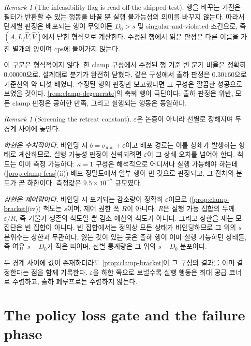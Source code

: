 \documentclass[11pt]{article}
\theoremstyle{plain}
\theoremstyle{definition}
\theoremstyle{remark}
\newtheorem{remark}[theorem]{Remark}
\newcommand{\Vhat}{\widehat V}
\newcommand{\Lf}{L_f}
\begin{document}
\begin{remark}[The infeasibility flag is read off the shipped test]\label{rem:clamp-flag}
행을 바꾸는 기전은 필터가 반환할 수 있는 행동을 바꿀 뿐 실행 불가능성의 의미를
바꾸지 않는다. 따라서 단계별 판정은 배포되는 행이 무엇이든
$D_0 > s$ 및 singular-and-violated 조건으로, 즉 $(A, \Lf\Vhat, \Vhat)$에서
닫힌 형식으로 계산한다. 수정된 행에서 읽은 판정은 다른 이름을 가진 별개의 양이며
$\mathrm{cps}$에 들어가지 않는다.

이 구분은 형식적이지 않다. 한 clamp 구성에서 수정된 행 기준 빈 분기 비율은
정확히 $0.00000$으로, 설계대로 분기가 완전히 닫혔다. 같은 구성에서 출하 판정은
$0.30160$으로 기준선의 약 다섯 배였다. 수정된 행의 판정만 보고했다면 그 구성은
깔끔한 성공으로 보였을 것이다. \cref{rem:clamp-degenerate}의 축퇴 행이 극단이다:
출하 판정은 위반, 모든 clamp 판정은 공허한 만족, 그리고 실행되는 행동은 동일하다.
\end{remark}

\begin{remark}[Screening the retreat constant]\label{rem:eps-screen}
$\varepsilon$은 논증이 아니라 선별로 정해지며 두 경계 사이에 놓인다.

\emph{하한은 수치적이다.} 바인딩 시 $b = \sigma_{\min} + \varepsilon$이고 배포
경로는 이를 상쇄가 발생하는 형태로 계산하므로, 실행 가능성 판정이 신뢰되려면
$\varepsilon$이 그 상쇄 오차를 넘어야 한다. 척도는 이미 측정 가능하다:
$\kappa = 1$ 구성은 해석적으로 어디서나 실행 가능해야 하는데
(\cref{prop:clamp-feas}(ii)) 배포 정밀도에서 일부 행이 빈 것으로 판정되고,
그 잔차의 분포가 곧 하한이다. 측정값은 $9.5 \times 10^{-7}$ 규모였다.

\emph{상한은 제어량이다.} 바인딩 시 포기되는 감소량이 정확히 $\varepsilon$이므로
(\cref{prop:clamp-bracket}(iv)) 척도는 $s$이며, 제어 권한 폭 $R$이 아니다. $R$은
실행 가능 집합의 두께 $\varepsilon/R$, 즉 기울기 생존의 척도일 뿐 감소 예산의
척도가 아니다. 그리고 상한을 재는 모집단은 빈 집합이 아니다. 빈 집합에서는
정의상 모든 상태가 바인딩하므로 그 위의 $s$ 분위수는 상한과 무관하다. 잃는 것이
있는 곳은 출하 행이 이미 실행 가능하던 상태들, 즉 여유 $s - D_0$가 작은 띠이며,
선별 통계량은 그 위의 $s - D_0$ 분포이다.

두 경계 사이에 값이 존재하더라도 \cref{prop:clamp-bracket}이 그 구성의 결과를
이미 결정한다는 점을 함께 기록한다. $\varepsilon$을 하한 쪽으로 보낼수록 실행
행동은 최대 공급 코너로 수렴하고, 출하 폐루프로는 수렴하지 않는다.
\end{remark}

\section{The policy loss gate and the failure phase}\label{sec:gate}
\end{document}
